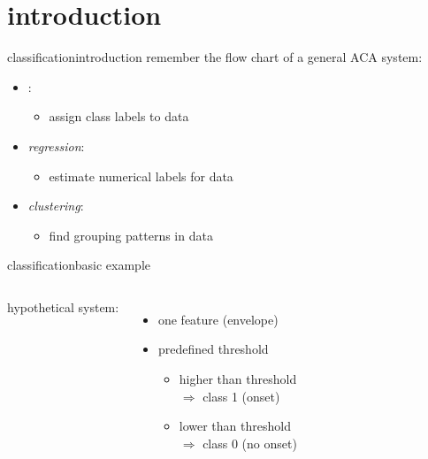     \section[intro]{introduction}
        \begin{frame}{classification}{introduction}
            remember the flow chart of a general ACA system:
            \vspace{-3mm}
            \begin{figure}
                
            \end{figure}
            \begin{itemize}
                \item<2->   : 
                    \begin{itemize}
                        \item   assign class labels to data
                    \end{itemize}
                \item<2->   \textit{regression}:
                    \begin{itemize}
                        \item	estimate numerical labels for data
                    \end{itemize}
                \item<2->   \textit{clustering}:
                    \begin{itemize}
                        \item	find grouping patterns in data
                    \end{itemize}
            \end{itemize}
        \end{frame}
        \begin{frame}{classification}{basic example}
             \begin{columns}
                    hypothetical system:
                    \begin{itemize}
                        \item   one feature (envelope)
                        \item   predefined threshold
                            \begin{itemize}
                                \item   higher than threshold\\ $\Rightarrow$ class 1 (onset)
                                \item   lower than threshold\\ $\Rightarrow$ class 0 (no onset)
                            \end{itemize}
                    \end{itemize}
                \vspace{-10mm}
            \end{columns}
        \end{frame}
        
